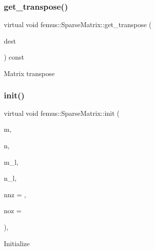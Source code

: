 \subsubsection{\texorpdfstring{get\+\_\+transpose()}{get\_transpose()}}
{\footnotesize\ttfamily virtual void femus\+::\+Sparse\+Matrix\+::get\+\_\+transpose (\begin{DoxyParamCaption}\item[{\mbox{\hyperlink{classfemus_1_1_sparse_matrix}{Sparse\+Matrix}} \&}]{dest }\end{DoxyParamCaption}) const\hspace{0.3cm}{\ttfamily [pure virtual]}}

Matrix transpose \mbox{\label{classfemus_1_1_sparse_matrix_a531f103b054502698cbe01767640861d}} 
\subsubsection{\texorpdfstring{init()}{init()}\hspace{0.1cm}{\footnotesize\ttfamily [1/4]}}
{\footnotesize\ttfamily virtual void femus\+::\+Sparse\+Matrix\+::init (\begin{DoxyParamCaption}\item[{const int}]{m,  }\item[{const int}]{n,  }\item[{const int}]{m\+\_\+l,  }\item[{const int}]{n\+\_\+l,  }\item[{const int}]{nnz = {},  }\item[{const int}]{noz = {} }\end{DoxyParamCaption})\hspace{0.3cm}{\ttfamily [inline]}, {\ttfamily [virtual]}}

Initialize \mbox{\label{classfemus_1_1_sparse_matrix_ac07bdd8037bcf0cde19c2e0e42f3775c}} 
